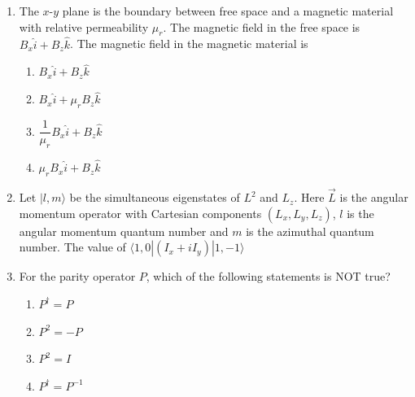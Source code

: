 \documentclass[journal,12pt,onecolumn]{IEEEtran}
\theoremstyle{remark}
\begin{document}
\begin{enumerate}
    \item The $x$-$y$ plane is the boundary between free space and a magnetic material with relative permeability $\mu_r$. The magnetic field in the free space is $B_x \hat{i} + B_z \hat{k}$. The magnetic field in the magnetic material is
    \begin{enumerate}
        \item $B_x \hat{i} + B_z \hat{k}$
        \item $B_x \hat{i} + \mu_r B_z \hat{k}$
        \item $\dfrac{1}{\mu_r} B_x \hat{i} + B_z \hat{k}$
        \item $\mu_r B_x \hat{i} + B_z \hat{k}$
    \end{enumerate}
    
    \item Let $|l, m\rangle$ be the simultaneous eigenstates of $L^2$ and $L_z$. Here $\vec{L}$ is the angular momentum operator with Cartesian components $(L_x, L_y, L_z)$, $l$ is the angular momentum quantum number and $m$ is the azimuthal quantum number. The value of $\langle 1,0 |(I_x + i I_y)| 1,-1\rangle$
    \begin{enumerate}
    \end{enumerate}
    \item For the parity operator $P$, which of the following statements is NOT true?
    \begin{multicols}{4}
        
    
    \begin{enumerate}
        \item $P^\dagger = P$
        \item $P^2 = -P$
        \item $P^2 = I$
        \item $P^\dagger = P^{-1}$
    \end{enumerate}
    \end{multicols}
  

\end{enumerate}
\end{document}

